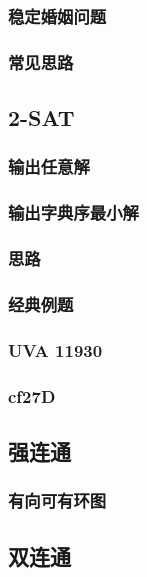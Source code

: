 \documentclass[10pt,a4paper]{article}
\begin{document}
\subsubsection{稳定婚姻问题}

\subsubsection{常见思路}

\subsection{2-SAT}
\subsubsection{输出任意解}

\subsubsection{输出字典序最小解}

\subsubsection{思路}

\subsubsection{经典例题}

\subsubsection{UVA 11930}

\subsubsection{cf27D}

\subsection{强连通}
\subsubsection{有向可有环图}

\subsection{双连通}
\end{document}
